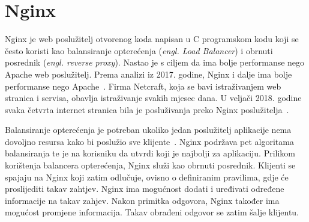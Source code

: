 \section{Nginx}
Nginx je web poslužitelj otvorenog koda napisan u C programskom kodu koji se često koristi kao
balansiranje opterećenja (\textit{engl. Load Balancer}) i obrnuti posrednik (\textit{engl. reverse
proxy}). Nastao je s ciljem da ima bolje performanse nego Apache web poslužitelj.  Prema analizi iz
2017. godine, Nginx i dalje ima bolje performanse nego Apache~\citep{nguyen2017comparative}.
Firma Netcraft, koja se bavi istraživanjem web stranica i servisa, obavlja istraživanje svakih
mjesec dana. U veljači 2018. godine svaka četvrta internet stranica bila je posluživanja preko Nginx
poslužitelja~\citep{Netcraft2018}.

Balansiranje opterećenja je potreban ukoliko jedan poslužitelj aplikacije nema dovoljno resursa kako
bi poslužio sve klijente~\citep{soni2016load}. Nginx podržava pet algoritama balansiranja te je na
korisniku da utvrdi koji je najbolji za aplikaciju. Prilikom korištenja balancera opterećenja, Nginx
služi kao obrnuti posrednik. Klijenti se spajaju na Nginx koji zatim odlučuje, ovisno o definiranim
pravilima, gdje će proslijediti takav zahtjev. Nginx ima mogućnost dodati i uređivati određene
informacije na takav zahjev. Nakon primitka odgovora, Nginx također ima mogućost promjene
informacija. Takav obrađeni odgovor se zatim šalje klijentu.
